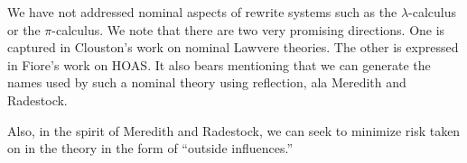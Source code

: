 \documentclass{llncs}
\renewcommand{\:}{\colon}
\newcommand{\pic}{$\pi$-calculus}
\begin{document}
We have not addressed nominal aspects of rewrite systems such as the
$\lambda$-calculus or the {\pic}. We note that there are two very
promising directions. One is captured in Clouston’s work on nominal
Lawvere theories. The other is expressed in Fiore’s work on HOAS. It
also bears mentioning that we can generate the names used by such a
nominal theory using reflection, ala Meredith and Radestock.

Also, in the spirit of Meredith and Radestock, we can seek to minimize
risk taken on in the theory in the form of “outside influences.”




\end{document}
